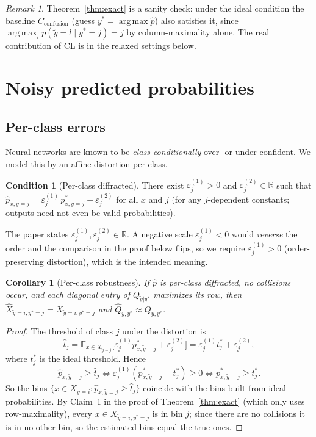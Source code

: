 \documentclass[11pt,a4paper]{report}
\newcommand{\Cconf}{C_{\text{confusion}}}
\newcommand{\E}{\mathbb{E}}
\newcommand{\R}{\mathbb{R}}
\newcommand{\argmax}{\operatorname*{arg\,max}}
\newcommand{\1}{\mathbf 1}
\newcommand{\eps}{\varepsilon}
\theoremstyle{definition}
\newtheorem{condition}[definition]{Condition}
\theoremstyle{plain}
\newtheorem{corollary}[definition]{Corollary}
\theoremstyle{remark}
\newtheorem*{remark}{Remark}
\begin{document}
\begin{remark}
Theorem~\ref{thm:exact} is a sanity check: under the ideal condition the baseline $\Cconf$ (guess $y^*=\argmax\hat p$) also satisfies it, since $\argmax_l p(\tilde y=l\mid y^*=j)=j$ by column-maximality alone. The real contribution of CL is in the relaxed settings below.
\end{remark}

\section{Noisy predicted probabilities}
\subsection{Per-class errors}
Neural networks are known to be \emph{class-conditionally} over- or under-confident. We model this by an affine distortion per class.
\begin{condition}[Per-class diffracted]\label{cond:perclass}
There exist $\eps^{(1)}_j>0$ and $\eps^{(2)}_j\in\R$ such that $\hat p_{x,\tilde y=j}=\eps^{(1)}_j\,p^*_{x,\tilde y=j}+\eps^{(2)}_j$ for all $x$ and $j$ (for any $j$-dependent constants; outputs need not even be valid probabilities).
\end{condition}
\begin{pitfall}
The paper states $\eps_j^{(1)},\eps_j^{(2)}\in\R$. A negative scale $\eps_j^{(1)}<0$ would \emph{reverse} the order and the comparison in the proof below flips, so we require $\eps_j^{(1)}>0$ (order-preserving distortion), which is the intended meaning.
\end{pitfall}

\begin{corollary}[Per-class robustness]\label{cor:perclass}
If $\hat p$ is per-class diffracted, \emph{no collisions} occur, and each diagonal entry of $Q_{\tilde y|y^*}$ maximizes its row, then $\hat X_{\tilde y=i,y^*=j}=X_{\tilde y=i,y^*=j}$ and $\hat Q_{\tilde y,y^*}\approx Q_{\tilde y,y^*}$.
\end{corollary}
\begin{proof}
The threshold of class $j$ under the distortion is
\[
\hat t_j=\E_{x\in X_{\tilde y=j}}\bigl[\eps^{(1)}_j p^*_{x,\tilde y=j}+\eps^{(2)}_j\bigr]=\eps^{(1)}_j t^*_j+\eps^{(2)}_j,
\]
where $t_j^*$ is the ideal threshold. Hence
\[
\hat p_{x,\tilde y=j}\ge\hat t_j\iff \eps^{(1)}_j(p^*_{x,\tilde y=j}-t^*_j)\ge 0\iff p^*_{x,\tilde y=j}\ge t^*_j .
\]
So the bins $\{x\in X_{\tilde y=i}:\hat p_{x,\tilde y=j}\ge\hat t_j\}$ coincide with the bins built from ideal probabilities. By Claim~1 in the proof of Theorem~\ref{thm:exact} (which only uses row-maximality), every $x\in X_{\tilde y=i,y^*=j}$ is in bin $j$; since there are no collisions it is in no other bin, so the estimated bins equal the true ones.
\end{proof}
\end{document}
